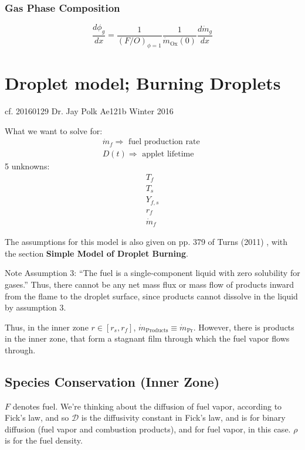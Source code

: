 \documentclass[10pt]{amsart}
\begin{document}
\begin{multicols*}{2}
\subsubsection{Gas Phase Composition}

\begin{equation}
\boxed{
  \frac{d\phi_g}{dx} = \frac{1}{ (F/O)_{\phi = 1}} \frac{1}{ \dot{m}_{\text{Ox}}(0)} \frac{d\dot{m}_g}{dx}
}
\end{equation}

\section{Droplet model; Burning Droplets}

cf. 20160129 Dr. Jay Polk Ae121b Winter 2016

What we want to solve for:
\[
\begin{aligned}
  \dot{m}_f \Longrightarrow \text{ fuel production rate } \\
  D(t) \Longrightarrow \text{ applet lifetime }
\end{aligned}
\]
5 unknowns: 
\[
\begin{aligned}
  T_f \\
  T_s \\
  Y_{f,s} \\
  r_f \\
  \dot{m}_f
\end{aligned}
\]

The assumptions for this model is also given on pp. 379 of Turns (2011) \cite{STurns2011}, with the section \textbf{Simple Model of Droplet Burning}.  

Note Assumption 3: ``The fuel is a single-component liquid with zero solubility for gases.''  Thus, there cannot be any net mass flux or mass flow of products inward from the flame to the droplet surface, since products cannot dissolve in the liquid by assumption 3.  

Thus, in the inner zone $r \in [r_s,r_f]$, $\dot{m}_{\text{Products}} \equiv \dot{m}_{\text{Pr}}$.  However, there is products in the inner zone, that form a stagnant film through which the fuel vapor flows through.    

\subsection{Species Conservation (Inner Zone) } $F$ denotes fuel. We're thinking about the diffusion of fuel vapor, according to Fick's law, and so $\mathcal{D}$ is the diffusivity constant in Fick's law, and is for binary diffusion (fuel vapor and combustion products), and for fuel vapor, in this case.  $\rho$ is for the fuel density.  


\end{multicols*}
\end{document}
